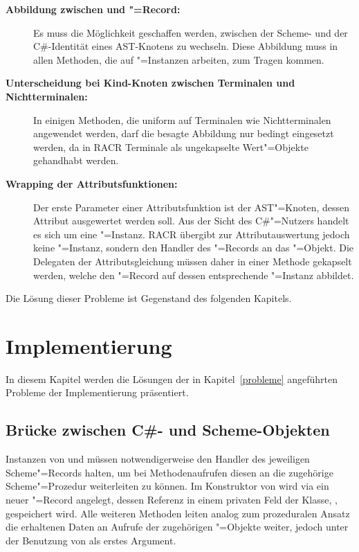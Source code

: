 \begin{description}
	\item[\textbf{Abbildung zwischen  und "=Record:}] Es muss die Möglichkeit geschaffen werden, zwischen der Scheme- und der C\#-Identität eines AST-Knotens zu wechseln. Diese Abbildung muss in allen Methoden, die auf "=Instanzen arbeiten, zum Tragen kommen.
	\item[\textbf{Unterscheidung bei Kind-Knoten zwischen Terminalen und Nichtterminalen:}] In einigen Methoden, die uniform auf Terminalen wie Nichtterminalen angewendet werden, darf die besagte Abbildung nur bedingt eingesetzt werden, da in RACR Terminale als ungekapselte Wert"=Objekte gehandhabt werden.
	\item[\textbf{Wrapping der Attributsfunktionen:}] Der erste Parameter einer Attributsfunktion ist der AST"=Knoten, dessen Attribut ausgewertet werden soll. Aus der Sicht des C\#"=Nutzers handelt es sich um eine "=Instanz. RACR übergibt zur Attributauswertung jedoch keine "=Instanz, sondern den Handler des "=Records an das "=Objekt. Die Delegaten der Attributsgleichung müssen daher in einer Methode gekapselt werden, welche den "=Record auf dessen entsprechende "=Instanz abbildet.
\end{description}

Die Lösung dieser Probleme ist Gegenstand des folgenden Kapitels.

\section{Implementierung}\label{implementierung}

In diesem Kapitel werden die Lösungen der in Kapitel~\ref{probleme} angeführten Probleme der Implementierung präsentiert.

\subsection{Brücke zwischen C\#- und Scheme-Objekten}\label{brücke}

Instanzen von  und  müssen notwendigerweise den Handler des jeweiligen Scheme"=Records halten, um bei Methodenaufrufen diesen an die zugehörige Scheme"=Prozedur weiterleiten zu können. Im Konstruktor von  wird via  ein neuer "=Record angelegt, dessen Referenz in einem privaten Feld der Klasse,  , gespeichert wird. Alle weiteren Methoden leiten analog zum prozeduralen Ansatz die erhaltenen Daten an Aufrufe der zugehörigen "=Objekte weiter, jedoch unter der Benutzung von  als erstes Argument.

